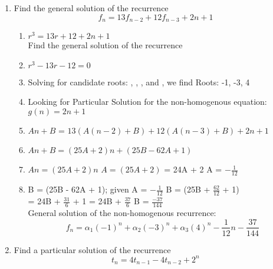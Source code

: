 \documentclass[11pt]{article}
\newcounter{prnum}
\newenvironment{problem}{{\vskip 0.2in\noindent\bf Problem
       \addtocounter{prnum}{1} \arabic{prnum}.}}{\vskip 0.1in}
\begin{document}
\begin{problem} 
\begin{enumerate}[label=\alph*)]
  \item  Find the general solution of the recurrence
    \begin{equation*}
      f_n = 13f_{n-2} + 12f_{n-3} + 2n + 1
    \end{equation*}
    \begin{enumerate}
      \item $r^3 = 13r + 12 + 2n + 1$\\

        Find the general solution of the recurrence
      \item $r^3 - 13r - 12 = 0$
      \item Solving for candidate roots: , , , and ,
        we find Roots: -1, -3, 4
      \item Looking for Particular Solution for the non-homogenous equation: $g(n) = 2n + 1$
      \item $An + B$ = $13(A(n-2) + B) + 12(A(n-3) + B) + 2n + 1$
      \item $An + B = (25A + 2)n + (25B - 62A + 1)$
      \item \Rightarrow $An = (25A + 2)n$ \Rightarrow $A = (25A + 2)$  = 24A + 2
       \Rightarrow A = $-\frac{1}{12}$
      \item \Rightarrow B = (25B - 62A + 1); given A = $-\frac{1}{12}$ \Rightarrow B = (25B + $\frac{62}{12}$ + 1)  \\

         = 24B + $\frac{31}{6}$ + 1  = 24B + $\frac{37}{6}$ \Rightarrow B = $\frac{-37}{144}$\\

        General solution of the non-homogenous recurrence:
        \begin{equation}
          f_n = \alpha_1(-1)^n + \alpha_2(-3)^n + \alpha_3(4)^n - \frac{1}{12}n - \frac{37}{144}
        \end{equation}

    \end{enumerate}
  \item Find a particular solution of the recurrence
    \begin{equation*}
      t_n = 4t_{n-1} - 4t_{n-2} + 2^{n}
    \end{equation*}
\end{enumerate}
  
\end{problem}
\end{document}
